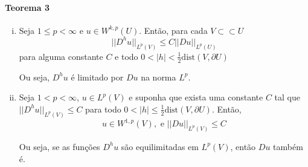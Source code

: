 \documentclass[a4paper, 11pt]{article}
\newcommand{\pu}{\partial U}
\begin{document}
\paragraph{Teorema 3}\label{t:sobolev-quociente-de-diferenças}
\begin{enumerate}[(i)]
	\item Seja $1\leq p < \infty$ e $u \in W^{k,p}(U)$. Então, para cada $V \subset\subset U$ \[ ||D^hu||_{L^p(V)} \leq C ||Du||_{L^p(U)} \] para alguma constante $C$ e todo $0 < |h| < \frac{1}{2}\text{dist}(V, \pu)$
	
	Ou seja, $D^h u$ é limitado por $Du$ na norma $L^p$.

	\item Seja $1 < p < \infty$, $u \in L^p(V)$ e suponha que exista uma constante $C$ tal que $||D^hu||_{L^p(V)}\leq C$ para todo $0<|h|\leq \frac{1}{2}\text{dist}(V,\pu)$. Então, \[u \in W^{1,p}(V), \text{ e } ||Du||_{L^p(V)} \leq C\]
	
	Ou seja, se as funções $D^h u$ são equilimitadas em $L^p(V)$, então $Du$ também é.
\end{enumerate}
\end{document}
